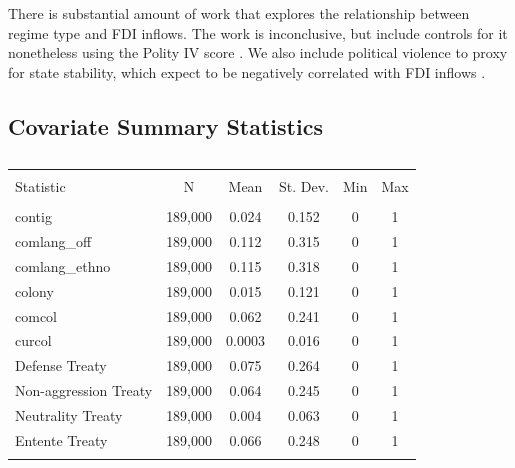 \documentclass{article}
\begin{document}
There is substantial amount of work that explores the relationship between regime type and FDI inflows. The work is inconclusive, but include controls for it nonetheless using the Polity IV score \citep{polity2012polity}. We also include political violence to proxy for state stability, which expect to be negatively correlated with FDI inflows \citep{marshall2005major}.
\newpage
\subsection{Covariate Summary Statistics}

\begin{table}[!htbp] \centering 
  \caption{} 
  \label{} 
\begin{tabular}{@{\extracolsep{5pt}}lccccc} 
\\[-1.8ex]\hline 
\hline \\[-1.8ex] 
Statistic & \multicolumn{1}{c}{N} & \multicolumn{1}{c}{Mean} & \multicolumn{1}{c}{St. Dev.} & \multicolumn{1}{c}{Min} & \multicolumn{1}{c}{Max} \\ 
\hline \\[-1.8ex] 
contig & 189,000 & 0.024 & 0.152 & 0 & 1 \\ 
comlang\_off & 189,000 & 0.112 & 0.315 & 0 & 1 \\ 
comlang\_ethno & 189,000 & 0.115 & 0.318 & 0 & 1 \\ 
colony & 189,000 & 0.015 & 0.121 & 0 & 1 \\ 
comcol & 189,000 & 0.062 & 0.241 & 0 & 1 \\ 
curcol & 189,000 & 0.0003 & 0.016 & 0 & 1 \\  
Defense Treaty & 189,000 & 0.075 & 0.264 & 0 & 1 \\ 
Non-aggression Treaty & 189,000 & 0.064 & 0.245 & 0 & 1 \\ 
Neutrality Treaty & 189,000 & 0.004 & 0.063 & 0 & 1 \\ 
Entente Treaty & 189,000 & 0.066 & 0.248 & 0 & 1 \\ 
\hline \\[-1.8ex] 
\end{tabular} 
\end{table} 
\end{document}
